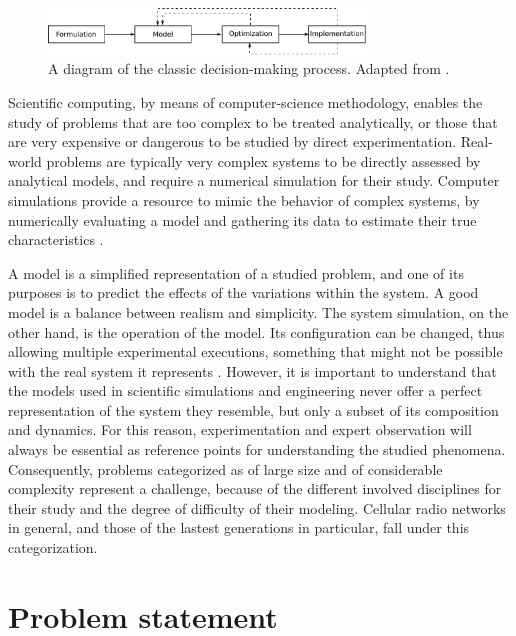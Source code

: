 \begin{figure}
\centering

\includegraphics[width=0.75\textwidth]{01-introduction/img/decision_making_process}

\caption{A diagram of the classic decision-making process. Adapted from \cite{Talbi_Metaheuristics:2009}.\label{fig:01-decision_making_process}}
\end{figure}


\bigskip{}


Scientific computing, by means of computer-science methodology, enables
the study of problems that are too complex to be treated analytically,
or those that are very expensive or dangerous to be studied by direct
experimentation. Real-world problems are typically very complex systems
to be directly assessed by analytical models, and require a numerical
simulation for their study. Computer simulations provide a resource
to mimic the behavior of complex systems, by numerically evaluating
a model and gathering its data to estimate their true characteristics
\cite{law2007simulation}.

A model is a simplified representation of a studied problem, and one
of its purposes is to predict the effects of the variations within
the system. A good model is a balance between realism and simplicity.
The system simulation, on the other hand, is the operation of the
model. Its configuration can be changed, thus allowing multiple experimental
executions, something that might not be possible with the real system
it represents \cite{maria1997introduction}. However, it is important
to understand that the models used in scientific simulations and engineering
never offer a perfect representation of the system they resemble,
but only a subset of its composition and dynamics. For this reason,
experimentation and expert observation will always be essential as
reference points for understanding the studied phenomena. Consequently,
problems categorized as of large size and of considerable complexity
represent a challenge, because of the different involved disciplines
for their study and the degree of difficulty of their modeling. Cellular
radio networks in general, and those of the lastest generations in
particular, fall under this categorization.


\section{Problem statement}

